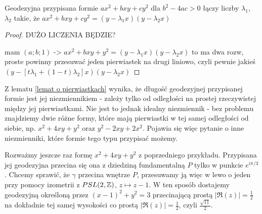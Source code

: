 \documentclass[a4paper, 12pt]{article}
\begin{document}
\begin{lemma}\label{lemat o pierwiastkach}
  Geodezyjna przypisana formie $ax^2+bxy+cy^2$ dla $b^2-4ac>0$ łączy liczby $\lambda_1$, $\lambda_2$ takie, że $ax^2+bxy+cy^2=(y-\lambda_1x)(y-\lambda_2x)$
\end{lemma}

\begin{proof}\color{red}
  DUŻO LICZENIA BĘDZIE?

  mam $(a;b;1)$ -> $ax^2+bxy+y^2=(y-\lambda_1x)(y-\lambda_2x)$ to ma dwa rozw, proste powinny przesuwać jeden pierwiastek na drugi liniowo, czyli pewnie jakieś $(y-[t\lambda_1+(1-t)\lambda_2]x)(y-\lambda_2x)$
\end{proof}

Z lematu \ref{lemat o pierwiastkach} wynika, że długość geodezyjnej przypisanej formie jest jej niezmiennikiem - zależy tylko od odległości na prostej rzeczywistej między jej pierwiastkami. Nie jest to jednak idealny niezmiennik - bez problemu znajdziemy dwie różne formy, które mają pierwiastki w tej samej odległości od siebie, np. $x^2+4xy+y^2$ oraz $y^2-2xy+2x^2$. Pojawia się więc pytanie o inne niezmienniki, które formie tego typu przypisać możemy.

\setcounter{example}{0}
\begin{example}
  Rozważmy jeszcze raz formę $x^2+4xy+y^2$ z poprzedniego przykładu. Przypisana jej geodezyjna przecina się ona z dziedziną fundamentalną $P$ tylko w punkcie $e^{i\pi/3}$. Chcemy sprawić, że $\gamma$ przecina wnętrze $P$, przesuwamy ją więc w lewo o jeden przy pomocy izometrii z $PSL(2,\mathbb{Z})$, $z\mapsto z-1$. W ten sposób dostajemy geodezyjną określoną przez $(x-1)^2+y^2=3$ przecinającą prostą $|\Re(z)|=\frac{1}{2}$ na dokładnie tej samej wysokości co prostą $|\Re(z)|=\frac{1}{2}$, czyli $\frac{\sqrt{11}}{2}$. 
\end{example}
\end{document}
